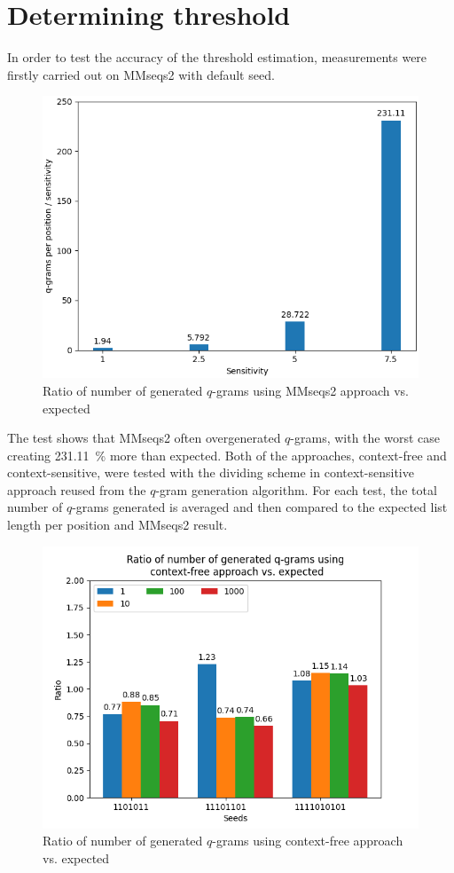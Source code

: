\documentclass[twoside,a4paper,bsc]{master}
\newcommand{\Qgram}[1]{\(#1\)-gram}
\begin{document}
\section{Determining threshold}
In order to test the accuracy of the threshold estimation, measurements
were firstly carried out on MMseqs2 with default seed.
\begin{figure}
\centering
\includegraphics[scale=0.6]{graphics/mmseqs2_sensitivity.png}
\caption{Ratio of number of generated \Qgram{q}s using MMseqs2 approach
vs. expected}
\label{fig:mmseqssens}
\end{figure}
The test shows that MMseqs2 often overgenerated \Qgram{q}s, with the worst
case creating 231.11~\% more than expected. Both of the approaches,
context-free and context-sensitive, were tested with the dividing scheme in
context-sensitive approach reused from the \Qgram{q} generation algorithm.
For each test, the total number of \Qgram{q}s generated is averaged and
then compared to the expected list length per position and MMseqs2 result.
\begin{figure}
\centering
\includegraphics[scale=0.6]{graphics/threshold_contextfree.png}
\caption{Ratio of number of generated \Qgram{q}s using context-free
approach vs. expected}
\label{fig:numctxfree}
\end{figure}
\end{document}
